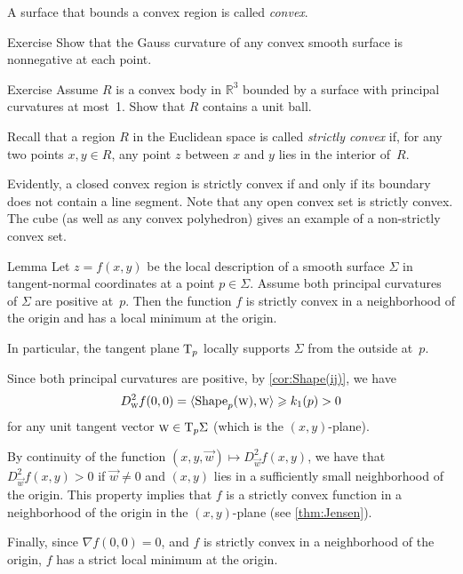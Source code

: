 A surface that bounds a convex region is called \emph{convex}.

\begin{thm}{Exercise}\label{ex:convex-surf}
Show that the Gauss curvature of any convex smooth surface is nonnegative at each point.
\end{thm}

\begin{thm}{Exercise}\label{ex:convex-lagunov}
Assume $R$ is a convex body in $\mathbb{R}^3$ bounded by a surface with principal curvatures at most~1.
Show that $R$ contains a unit ball.
\end{thm}

Recall that a region $R$ in the Euclidean space is called  {}\emph{strictly convex} if, for any two points $x,y\in R$, any point $z$ between $x$ and $y$ lies in the interior of~$R$.

Evidently, a closed convex region is strictly convex if and only if its boundary does not contain a line segment.
Note that any open convex set is strictly convex. 
The cube (as well as any convex polyhedron) gives an example of a non-strictly convex set.


\begin{thm}{Lemma}\label{lem:gauss+=>convexity}
Let $z=f(x,y)$ be the local description of a smooth surface $\Sigma$ in tangent-normal coordinates at a point $p\in\Sigma$.
Assume both principal curvatures of $\Sigma$ are positive at~$p$.
Then the function $f$ is strictly convex in a neighborhood of the origin and has a local minimum at the origin.

In particular, the tangent plane $\mathrm{T}_p$ locally supports $\Sigma$ from the outside at~$p$.
\end{thm}

Since both principal curvatures are positive, by \ref{cor:Shape(ij)}, we have 
\[D^2_{\text{\sc{w}}}f(0,0)=\langle \mathop{\rm Shape}\nolimits_p({\text{\sc{w}}}),{\text{\sc{w}}}\rangle\geqslant k_1(p)>0\] 
for any unit tangent vector ${\text{\sc{w}}}\in\mathrm{T}_p\Sigma$ (which is the $(x,y)$-plane).

By continuity of the function $(x,y,{\vec w})\mapsto D^2_{\vec w}f(x,y)$,
we have that $D^2_{\vec w}f(x,y)>0$ if $\vec w\ne 0$ and $(x,y)$ lies in a sufficiently small neighborhood of the origin.
This property implies that $f$ is a strictly convex function in a neighborhood of the origin in the $(x,y)$-plane (see \ref{thm:Jensen}).

Finally, since $\nabla f(0,0)=0$, and $f$ is strictly convex in a neighborhood of the origin, $f$ has a strict local minimum at the origin.
\qeds

